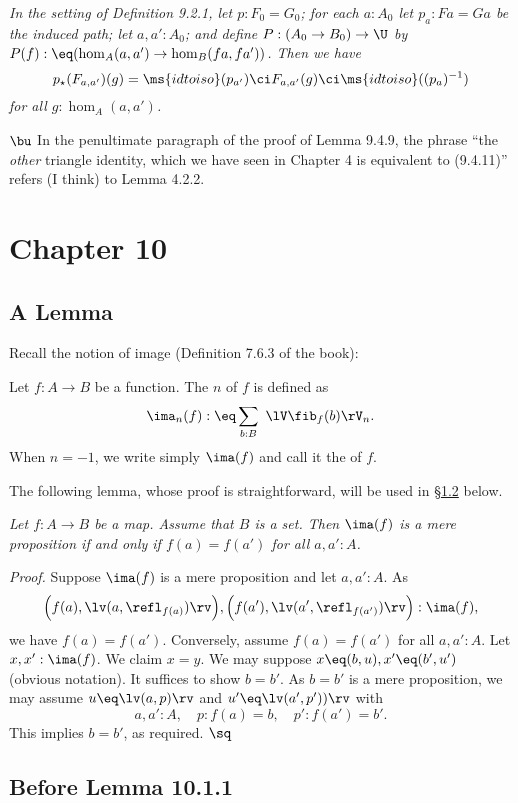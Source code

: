 \documentclass[12pt]{article}
\begin{document}
\emph{In the setting of Definition 9.2.1, let $p:F_0=G_0$; for each $a:A_0$ let $p_a:Fa=Ga$ be the induced path; let $a,a':A_0$; and define $P:(A_0\to B_0)\to\U$ by $P(f):\eq(\hom_A(a,a')\to\hom_B(fa,fa'))$. Then we have} 
$$
p_\star(F_{a,a'})(g)=\ms{idtoiso}(p_{a'})\ci F_{a,a'}(g)\ci\ms{idtoiso}((p_a)^{-1})
$$ 
\emph{for all $g:\hom_A(a,a')$.}

\nn$\bu$ In the penultimate paragraph of the proof of Lemma 9.4.9, the phrase ``the \emph{other} triangle identity, which we have seen in Chapter 4 is equivalent to (9.4.11)'' refers (I think) to Lemma 4.2.2.


\section{Chapter 10}

\subsection{A Lemma}\label{imfmp}

Recall the notion of image (Definition 7.6.3 of the book):

\nn{} Let $f:A\to B$ be a function. The $n$ of $f$ is defined as
$$
\ima_n(f):\eq\sum_{b:B}\ \lV\fib_f(b)\rV_n.
$$ 
When $n=-1$, we write simply $\ima(f)$ and call it the  of $f$.

The following lemma, whose proof is straightforward, will be used in \S\ref{1011} below.

\nn{} \emph{Let $f:A\to B$ be a map. Assume that $B$ is a set. Then $\ima(f)$ is a mere proposition if and only if $f(a)=f(a')$ for all $a,a':A$.}

\nn\emph{Proof.} Suppose $\ima(f)$ is a mere proposition and let $a,a':A$. As 
$$
\Big(f(a),\lv(a,\refl_{f(a)})\rv\Big),\Big(f(a'),\lv(a',\refl_{f(a')})\rv\Big):\ima(f),
$$ 
we have $f(a)=f(a')$. Conversely, assume $f(a)=f(a')$ for all $a,a':A$. Let $x,x':\ima(f)$. We claim $x=y$. We may suppose $x\eq(b,u),x'\eq(b',u')$ (obvious notation). It suffices to show $b=b'$. As $b=b'$ is a mere proposition, we may assume $u\eq\lv(a,p)\rv$ and $u'\eq\lv(a',p'))\rv$ with 
$$
a,a':A,\quad p:f(a)=b,\quad p':f(a')=b'.
$$ 
This implies $b=b'$, as required. $\sq$


\subsection{Before Lemma 10.1.1}\label{1011}
\end{document}

